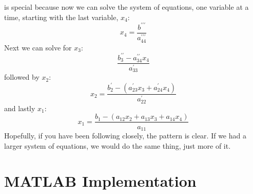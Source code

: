  is special because now we can solve the system of equations, one variable at a time, starting with the last variable, $x_4$:  
\begin{equation*}
x_{4} = \frac{b^{\prime \prime \prime}}{a^{\prime \prime \prime}_{44}}
\end{equation*}
Next we can solve for $x_3$:
\begin{equation*}
\frac{b^{\prime \prime}_3 - a^{\prime \prime}_{34}x_4}{a^{\prime}_{33}}
\end{equation*}
followed by $x_2$:
\begin{equation*}
x_{2} = \frac{b^{\prime}_2 - (a^{\prime}_{23}x_3 + a^{\prime}_{24}x_4) }{a^{\prime}_{22}}
\end{equation*}
and lastly $x_1$:
\begin{equation*}
x_1 = \frac{b_1 - (a_{12}x_2 + a_{13}x_3 + a_{14}x_4)}{a_{11}}
\end{equation*}
Hopefully, if you have been following closely, the pattern is clear. If we had a larger system of equations, we would do the same thing, just more of it.

\section{MATLAB Implementation}

